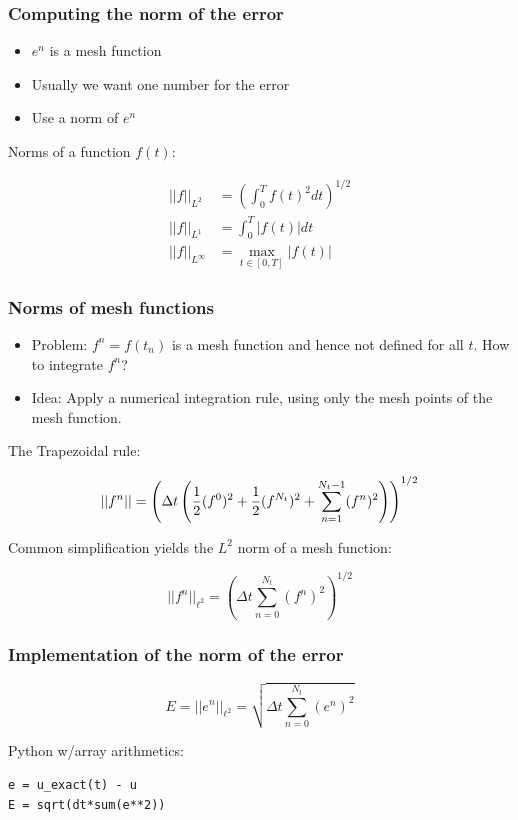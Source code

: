 \documentclass{beamer}
\begin{document}
\begin{frame}
\frametitle{Computing the norm of the error}

\label{decay:computing:error:norm}

\begin{itemize}
 \item $e^n$ is a mesh function

 \item Usually we want one number for the error

 \item Use a norm of $e^n$
\end{itemize}

\noindent
Norms of a function $f(t)$:

\begin{align}
||f||_{L^2} &= \left( \int_0^T f(t)^2 dt\right)^{1/2}
\label{decay:norms:L2}\\ 
||f||_{L^1} &= \int_0^T |f(t)| dt
\label{decay:norms:L1}\\ 
||f||_{L^\infty} &= \max_{t\in [0,T]}|f(t)|
\label{decay:norms:Linf}
\end{align}
\end{frame}

\begin{frame}
\frametitle{Norms of mesh functions}

\begin{itemize}
 \item Problem: $f^n =f(t_n)$ is a mesh function and hence not defined for all $t$.
   How to integrate $f^n$?

 \item Idea: Apply a numerical integration rule, using only
   the mesh points of the mesh function.
\end{itemize}

\noindent
The Trapezoidal rule:

\[ ||f^n|| = \left(\Delta t\left(\frac{1}{2}(f^0)^2 + \frac{1}{2}(f^{N_t})^2
+ \sum_{n=1}^{N_t-1} (f^n)^2\right)\right)^{1/2} \]

Common simplification yields the $L^2$ norm of a mesh function:

\[ ||f^n||_{\ell^2} = \left(\Delta t\sum_{n=0}^{N_t} (f^n)^2\right)^{1/2}\]
\end{frame}

\begin{frame}
\frametitle{Implementation of the norm of the error}

\[ E = ||e^n||_{\ell^2}  = \sqrt{\Delta t\sum_{n=0}^{N_t} (e^n)^2}\]

Python w/array arithmetics:

\begin{verbatim}
e = u_exact(t) - u
E = sqrt(dt*sum(e**2))
\end{verbatim}
\end{frame}
\end{document}

